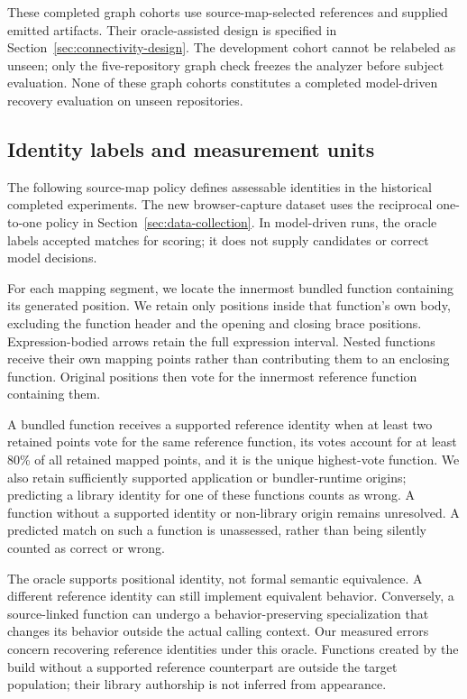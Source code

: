 These completed graph cohorts use source-map-selected references and supplied emitted artifacts. Their oracle-assisted design is specified in Section~\ref{sec:connectivity-design}. The development cohort cannot be relabeled as unseen; only the five-repository graph check freezes the analyzer before subject evaluation. None of these graph cohorts constitutes a completed model-driven recovery evaluation on unseen repositories.

\subsection{Identity labels and measurement units}
\label{sec:identity-measurements}
The following source-map policy defines assessable identities in the historical completed experiments. The new browser-capture dataset uses the reciprocal one-to-one policy in Section~\ref{sec:data-collection}. In model-driven runs, the oracle labels accepted matches for scoring; it does not supply candidates or correct model decisions.

For each mapping segment, we locate the innermost bundled function containing its generated position. We retain only positions inside that function's own body, excluding the function header and the opening and closing brace positions. Expression-bodied arrows retain the full expression interval. Nested functions receive their own mapping points rather than contributing them to an enclosing function. Original positions then vote for the innermost reference function containing them.

A bundled function receives a supported reference identity when at least two retained points vote for the same reference function, its votes account for at least 80\% of all retained mapped points, and it is the unique highest-vote function. We also retain sufficiently supported application or bundler-runtime origins; predicting a library identity for one of these functions counts as wrong. A function without a supported identity or non-library origin remains unresolved. A predicted match on such a function is unassessed, rather than being silently counted as correct or wrong.

The oracle supports positional identity, not formal semantic equivalence. A different reference identity can still implement equivalent behavior. Conversely, a source-linked function can undergo a behavior-preserving specialization that changes its behavior outside the actual calling context. Our measured errors concern recovering reference identities under this oracle. Functions created by the build without a supported reference counterpart are outside the target population; their library authorship is not inferred from appearance.

